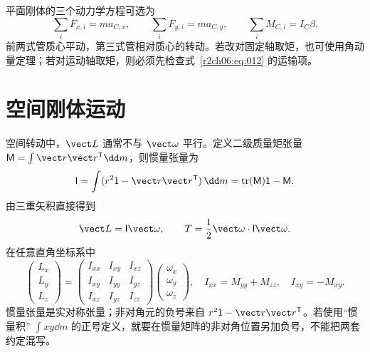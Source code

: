 平面刚体的三个动力学方程可选为
\begin{equation}
 \sum_iF_{x,i}=ma_{C,x},\qquad
 \sum_iF_{y,i}=ma_{C,y},\qquad
 \sum_iM_{C,i}=I_C\beta.
 \label{r2ch06:eq:013}
\end{equation}
前两式管质心平动，第三式管相对质心的转动。若改对固定轴取矩，也可使用角动量定理；若对运动轴取矩，则必须先检查式~\eqref{r2ch06:eq:012} 的运输项。

\section{空间刚体运动}
\label{r2ch06:sec:spatial}

空间转动中，$\vect L$ 通常不与 $\vect\omega$ 平行。定义二级质量矩张量
$\mathsf M=\int\vect r\vect r^{\mathsf T}\dd m$，则惯量张量为
\begin{equation}
 \mathsf I=\int(r^2\mathsf 1-\vect r\vect r^{\mathsf T})\,\dd m
 =\operatorname{tr}(\mathsf M)\mathsf 1-\mathsf M.
 \label{r2ch06:eq:014}
\end{equation}
由三重矢积直接得到
\begin{equation}
 \vect L=\mathsf I\vect\omega,\qquad
 T=\frac12\vect\omega\cdot\mathsf I\vect\omega.
 \label{r2ch06:eq:015}
\end{equation}
在任意直角坐标系中
\begin{equation}
 \begin{pmatrix}L_x\\L_y\\L_z\end{pmatrix}
 =\begin{pmatrix}
 I_{xx}&I_{xy}&I_{xz}\\
 I_{xy}&I_{yy}&I_{yz}\\
 I_{xz}&I_{yz}&I_{zz}
 \end{pmatrix}
 \begin{pmatrix}\omega_x\\\omega_y\\\omega_z\end{pmatrix},
 \quad
 I_{xx}=M_{yy}+M_{zz},\quad I_{xy}=-M_{xy}.
 \label{r2ch06:eq:016}
\end{equation}
惯量张量是实对称张量；非对角元的负号来自 $r^2\mathsf 1-\vect r\vect r^{\mathsf T}$。若使用“惯量积” $\int xy\dd m$ 的正号定义，就要在惯量矩阵的非对角位置另加负号，不能把两套约定混写。

